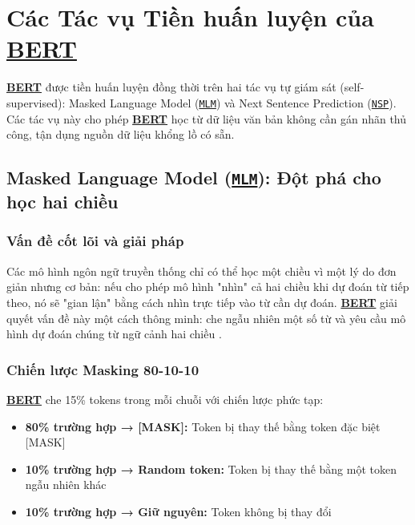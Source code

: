 \section{Các Tác vụ Tiền huấn luyện của \hyperref[acro:bert]{\textbf{BERT}}}
\label{sec:pre_training_tasks}

\hyperref[acro:bert]{\textbf{BERT}} được tiền huấn luyện đồng thời trên hai tác vụ tự giám sát (self-supervised): Masked Language Model (\hyperref[acro:mlm]{\texttt{MLM}}) và Next Sentence Prediction (\hyperref[acro:nsp]{\texttt{NSP}}). Các tác vụ này cho phép \hyperref[acro:bert]{\textbf{BERT}} học từ dữ liệu văn bản không cần gán nhãn thủ công, tận dụng nguồn dữ liệu khổng lồ có sẵn.

\subsection{Masked Language Model (\hyperref[acro:mlm]{\texttt{MLM}}): Đột phá cho học hai chiều}
\label{ssec:mlm}

\subsubsection{Vấn đề cốt lõi và giải pháp}
Các mô hình ngôn ngữ truyền thống chỉ có thể học một chiều vì một lý do đơn giản nhưng cơ bản: nếu cho phép mô hình "nhìn" cả hai chiều khi dự đoán từ tiếp theo, nó sẽ "gian lận" bằng cách nhìn trực tiếp vào từ cần dự đoán. \hyperref[acro:bert]{\textbf{BERT}} giải quyết vấn đề này một cách thông minh: che ngẫu nhiên một số từ và yêu cầu mô hình dự đoán chúng từ ngữ cảnh hai chiều \cite{devlin2018bert}.

\subsubsection{Chiến lược Masking 80-10-10}
\hyperref[acro:bert]{\textbf{BERT}} che 15\% tokens trong mỗi chuỗi với chiến lược phức tạp:

\begin{itemize}
    \item \textbf{80\% trường hợp → [MASK]:} Token bị thay thế bằng token đặc biệt [MASK]
    \item \textbf{10\% trường hợp → Random token:} Token bị thay thế bằng một token ngẫu nhiên khác
    \item \textbf{10\% trường hợp → Giữ nguyên:} Token không bị thay đổi
\end{itemize}

